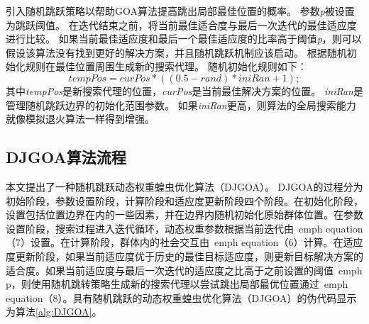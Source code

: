引入随机跳跃策略以帮助GOA算法提高跳出局部最佳位置的概率。 参数\emph{p}被设置为跳跃阈值。 在迭代结束之前，将当前最佳适合度与最后一次迭代的最佳适应度进行比较。 如果当前最佳适应度和最后一个最佳适应度的比率高于阈值\emph{p}，则可以假设该算法没有找到更好的解决方案，并且随机跳跃机制应该启动。 根据随机初始化规则在最佳位置周围生成新的搜索代理。 随机初始化规则如下：
\begin{equation}
    tempPos=curPos*((0.5-rand)*iniRan+1);
\end{equation} 
其中\emph{tempPos}是新搜索代理的位置，\emph{curPos}是当前最佳解决方案的位置。 \emph{iniRan}是管理随机跳跃边界的初始化范围参数。 如果\emph{iniRan}更高，则算法的全局搜索能力就像模拟退火算法一样得到增强。
\subsection{DJGOA算法流程}

本文提出了一种随机跳跃动态权重蝗虫优化算法（DJGOA）。 DJGOA的过程分为初始阶段，参数设置阶段，计算阶段和适应度更新阶段四个阶段。在初始化阶段，设置包括位置边界在内的一些因素，并在边界内随机初始化原始群体位置。在参数设置阶段，搜索过程进入迭代循环，动态权重参数根据当前迭代由\ emph {equation（7）}设置。在计算阶段，群体内的社会交互由\ emph {equation（6）}计算。在适应度更新阶段，如果当前适应度优于历史的最佳目标适应度，则更新目标解决方案的适合度。如果当前适应度与最后一次迭代的适应度之比高于之前设置的阈值\ emph {p}，则使用随机跳转策略生成新的搜索代理以尝试跳出局部最优位置通过\ emph {equation（8）}。具有随机跳跃的动态权重蝗虫优化算法（DJGOA）的伪代码显示为算法\ref{alg:DJGOA}。

